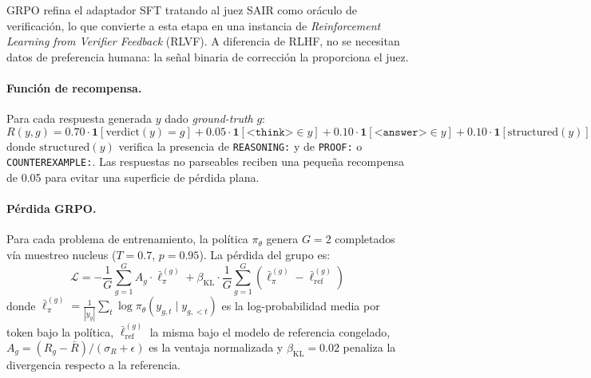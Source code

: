 \documentclass{article}
\begin{document}
GRPO refina el adaptador SFT tratando al juez SAIR como or\'aculo de verificaci\'on, lo que convierte a esta etapa en una instancia de \emph{Reinforcement Learning from Verifier Feedback} (RLVF). A diferencia de RLHF, no se necesitan datos de preferencia humana: la se\~nal binaria de correcci\'on la proporciona el juez.

\paragraph{Funci\'on de recompensa.} Para cada respuesta generada $y$ dado \textit{ground-truth} $g$:
\begin{equation}
R(y, g) = 0.70 \cdot \mathbf{1}[\text{verdict}(y) = g] + 0.05 \cdot \mathbf{1}[\texttt{<think>} \in y] + 0.10 \cdot \mathbf{1}[\texttt{<answer>} \in y] + 0.10 \cdot \mathbf{1}[\text{structured}(y)]
\label{eq:reward}
\end{equation}
donde $\text{structured}(y)$ verifica la presencia de \texttt{REASONING:} y de \texttt{PROOF:} o \texttt{COUNTEREXAMPLE:}. Las respuestas no parseables reciben una peque\~na recompensa de 0.05 para evitar una superficie de p\'erdida plana.

\paragraph{P\'erdida GRPO.} Para cada problema de entrenamiento, la pol\'itica $\pi_\theta$ genera $G{=}2$ completados v\'ia muestreo nucleus ($T{=}0.7$, $p{=}0.95$). La p\'erdida del grupo es:
\begin{equation}
\mathcal{L} = -\frac{1}{G}\sum_{g=1}^{G} A_g \cdot \bar{\ell}_{\pi}^{(g)} + \beta_{\text{KL}} \cdot \frac{1}{G}\sum_{g=1}^{G}\left(\bar{\ell}_{\pi}^{(g)} - \bar{\ell}_{\text{ref}}^{(g)}\right)
\label{eq:grpo}
\end{equation}
donde $\bar{\ell}_{\pi}^{(g)} = \frac{1}{|y_g|}\sum_{t} \log \pi_\theta(y_{g,t} \mid y_{g,<t})$ es la log-probabilidad media por token bajo la pol\'itica, $\bar{\ell}_{\text{ref}}^{(g)}$ la misma bajo el modelo de referencia congelado, $A_g = (R_g - \bar{R}) / (\sigma_R + \epsilon)$ es la ventaja normalizada y $\beta_{\text{KL}}{=}0.02$ penaliza la divergencia respecto a la referencia.
\end{document}
